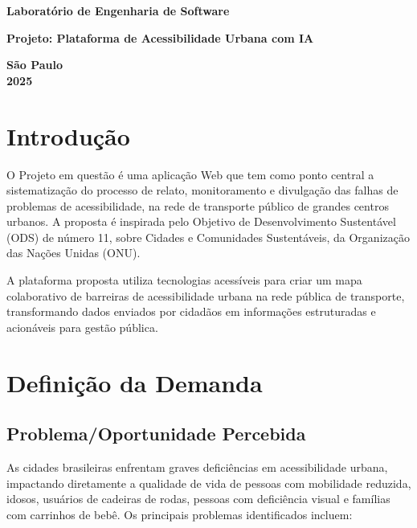 \documentclass[12pt,a4paper]{article}
\begin{document}
\begin{titlepage}
    \centering
    \vspace*{2cm}
    
    \huge
    \textbf{Laboratório de Engenharia de Software}
    
    \vspace{1.5cm}
    \Large
    \textbf{Projeto: Plataforma de Acessibilidade Urbana com IA}
    
    \vfill
    
    \large
    \textbf{São Paulo}\\
    \textbf{2025}
    
    \vspace{2cm}
\end{titlepage}

\tableofcontents
\newpage

\section{Introdução}
\label{sec:introducao}

O Projeto em questão é uma aplicação Web que tem como ponto central a sistematização do processo de relato, monitoramento e divulgação das falhas de problemas de acessibilidade, na rede de transporte público de grandes centros urbanos. A proposta é inspirada pelo Objetivo de Desenvolvimento Sustentável (ODS) de número 11, sobre Cidades e Comunidades Sustentáveis, da Organização das Nações Unidas (ONU).

A plataforma proposta utiliza tecnologias acessíveis para criar um mapa colaborativo de barreiras de acessibilidade urbana na rede pública de transporte, transformando dados enviados por cidadãos em informações estruturadas e acionáveis para gestão pública.

\section{Definição da Demanda}
\label{sec:definicao-demanda}

\subsection{Problema/Oportunidade Percebida}
\label{subsec:problema-oportunidade}

As cidades brasileiras enfrentam graves deficiências em acessibilidade urbana, impactando diretamente a qualidade de vida de pessoas com mobilidade reduzida, idosos, usuários de cadeiras de rodas, pessoas com deficiência visual e famílias com carrinhos de bebê. Os principais problemas identificados incluem:
\end{document}
